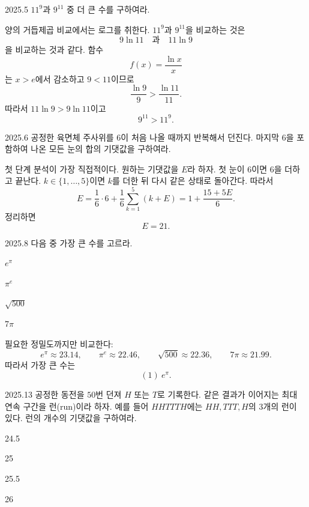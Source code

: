\begin{pastproblem}{2025.5}
$11^9$과 $9^{11}$ 중 더 큰 수를 구하여라.
\end{pastproblem}

\begin{solution}
양의 거듭제곱 비교에서는 로그를 취한다. $11^9$과 $9^{11}$을 비교하는 것은
\[
9\ln11\quad\text{과}\quad11\ln9
\]
을 비교하는 것과 같다. 함수
\[
f(x)=\frac{\ln x}{x}
\]
는 $x>e$에서 감소하고 $9<11$이므로
\[
\frac{\ln9}{9}>\frac{\ln11}{11}.
\]
따라서 $11\ln9>9\ln11$이고
\[
\boxed{9^{11}>11^9}.
\]
\end{solution}

\begin{pastproblem}{2025.6}
공정한 육면체 주사위를 $6$이 처음 나올 때까지 반복해서 던진다. 마지막 $6$을 포함하여 나온 모든 눈의 합의 기댓값을 구하여라.
\end{pastproblem}

\begin{solution}
첫 단계 분석이 가장 직접적이다. 원하는 기댓값을 $E$라 하자. 첫 눈이 $6$이면 $6$을 더하고 끝난다. $k\in\{1,\ldots,5\}$이면 $k$를 더한 뒤 다시 같은 상태로 돌아간다. 따라서
\[
E=\frac16\cdot6+\frac16\sum_{k=1}^5(k+E)
=1+\frac{15+5E}{6}.
\]
정리하면
\[
\boxed{E=21}.
\]
\end{solution}

\begin{pastproblem}{2025.8}
다음 중 가장 큰 수를 고르라.
\begin{problemchoices}
\item $e^\pi$
\item $\pi^e$
\item $\sqrt{500}$
\item $7\pi$
\end{problemchoices}
\end{pastproblem}

\begin{solution}
필요한 정밀도까지만 비교한다:
\[
e^\pi\approx23.14,\qquad
\pi^e\approx22.46,\qquad
\sqrt{500}\approx22.36,\qquad
7\pi\approx21.99.
\]
따라서 가장 큰 수는
\[
\boxed{(1)\ e^\pi}.
\]
\end{solution}

\begin{pastproblem}{2025.13}
공정한 동전을 $50$번 던져 $H$ 또는 $T$로 기록한다. 같은 결과가 이어지는 최대 연속 구간을 런(run)이라 하자. 예를 들어 $HHTTTH$에는 $HH,TTT,H$의 $3$개의 런이 있다. 런의 개수의 기댓값을 구하여라.
\begin{problemchoices}
\item 24.5
\item 25
\item 25.5
\item 26
\end{problemchoices}
\end{pastproblem}

